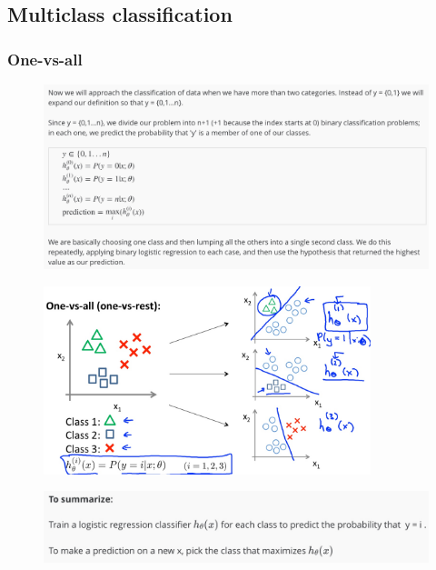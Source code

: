 \documentclass[12pt, A4,onecolumn]{article} %
\begin{document}
\newpage

\subsection{Multiclass classification}
\subsubsection{One-vs-all}

\begin{figure}[H]
	\centering
	\includegraphics[width=1\textwidth]{./Imagenes/multiClass1}
\end{figure}

\begin{figure}[H]
	\centering
	\includegraphics[width=0.85\textwidth]{./Imagenes/multiClass2}
\end{figure}

\begin{figure}[H]
	\centering
	\includegraphics[width=1\textwidth]{./Imagenes/multiClass3}
\end{figure}
\end{document}
